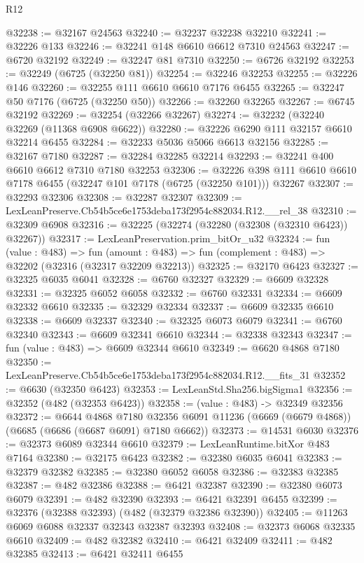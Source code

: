\begin{lexlean}{R12}
\begin{coremodule}
@32238 := @32167 @24563
@32240 := @32237 @32238 @32210
@32241 := @32226 @133
@32246 := @32241 @148 @6610 @6612 @7310 @24563
@32247 := @6720 @32192
@32249 := @32247 @81 @7310
@32250 := @6726 @32192
@32253 := @32249 (@6725 (@32250 @81))
@32254 := @32246 @32253
@32255 := @32226 @146
@32260 := @32255 @111 @6610 @6610 @7176 @6455
@32265 := @32247 @50 @7176 (@6725 (@32250 @50))
@32266 := @32260 @32265
@32267 := @6745 @32192
@32269 := @32254 (@32266 @32267)
@32274 := @32232 (@32240 @32269 (@11368 @6908 @6622))
@32280 := @32226 @6290 @111 @32157 @6610 @32214 @6455
@32284 := @32233 @5036 @5066 @6613 @32156
@32285 := @32167 @7180
@32287 := @32284 @32285 @32214
@32293 := @32241 @400 @6610 @6612 @7310 @7180 @32253
@32306 := @32226 @398 @111 @6610 @6610 @7178 @6455 (@32247 @101 @7178 (@6725 (@32250 @101))) @32267
@32307 := @32293 @32306
@32308 := @32287 @32307
@32309 := LexLeanPreserve.Cb54b5ce6e1753deba173f2954c882034.R12.__rel_38
@32310 := @32309 @6908
@32316 := @32225 (@32274 (@32280 (@32308 (@32310 @6423)) @32267))
@32317 := LexLeanPreservation.prim_bitOr_u32
@32324 := fun (value : @483) =>
  fun (amount : @483) => fun (complement : @483) => @32202 (@32316 (@32317 @32209 @32213))
@32325 := @32170 @6423
@32327 := @32325 @6035 @6041
@32328 := @6760 @32327
@32329 := @6609 @32328
@32331 := @32325 @6052 @6058
@32332 := @6760 @32331
@32334 := @6609 @32332 @6610
@32335 := @32329 @32334
@32337 := @6609 @32335 @6610
@32338 := @6609 @32337
@32340 := @32325 @6073 @6079
@32341 := @6760 @32340
@32343 := @6609 @32341 @6610
@32344 := @32338 @32343
@32347 := fun (value : @483) => @6609 @32344 @6610
@32349 := @6620 @4868 @7180
@32350 := LexLeanPreserve.Cb54b5ce6e1753deba173f2954c882034.R12.__fits_31
@32352 := @6630 (@32350 @6423)
@32353 := LexLeanStd.Sha256.bigSigma1
@32356 := @32352 (@482 (@32353 @6423))
@32358 := (value : @483) -> @32349 @32356
@32372 := @6644
    @4868
    @7180
    @32356
    @6091
    @11236
    (@6669 (@6679 @4868))
    (@6685 (@6686 (@6687 @6091) @7180 @6662))
@32373 := @14531 @6030
@32376 := @32373 @6089 @32344 @6610
@32379 := LexLeanRuntime.bitXor @483 @7164
@32380 := @32175 @6423
@32382 := @32380 @6035 @6041
@32383 := @32379 @32382
@32385 := @32380 @6052 @6058
@32386 := @32383 @32385
@32387 := @482 @32386
@32388 := @6421 @32387
@32390 := @32380 @6073 @6079
@32391 := @482 @32390
@32393 := @6421 @32391 @6455
@32399 := @32376 (@32388 @32393) (@482 (@32379 @32386 @32390))
@32405 := @11263 @6069 @6088 @32337 @32343 @32387 @32393
@32408 := @32373 @6068 @32335 @6610
@32409 := @482 @32382
@32410 := @6421 @32409
@32411 := @482 @32385
@32413 := @6421 @32411 @6455

\end{coremodule}
\end{lexlean}
